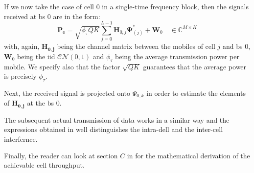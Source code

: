 \documentclass[11pt]{book}
\begin{document}
If we now take the case of cell $0$ in a single-time frequency block, then the signals received at \gls{bs} $0$ are in the form:
\begin{equation}
  \mathbf{P}_0 = \sqrt{\phi_{\tau} QK}\sum_{j=0}^{L-1}\mathbf{H}_{0,j}\mathbf{\Psi}_{(j)}^* + \mathbf{W}_0 \quad \in \mathbb{C}^{M\times K}
\end{equation}
with, again, $\mathbf{H_{0,j}}$ being the channel matrix between the mobiles of cell $j$ and \gls{bs} $0$, $\mathbf{W}_0$ being the iid $\mathcal{CN}(0,1)$ and $\phi_{\tau}$ being the average transmission power per mobile. We specify also that the factor $\sqrt{QK}$ guarantees that the average power is precisely $\phi_{\tau}$.

Next, the received signal is projected onto $\Psi_{0,k}$ in order to estimate the elements of $\mathbf{H_{0,j}}$ at the \gls{bs} $0$.

The subsequent actual transmission of data works in a similar way and the expressions obtained in \cite{Ahsan2016} well distinguishes the intra-dell and the inter-cell interfernce.

Finally, the reader can look at section $C$ in \cite{Ahsan2016} for the mathematical derivation of the achievable cell throughput.
\end{document}
